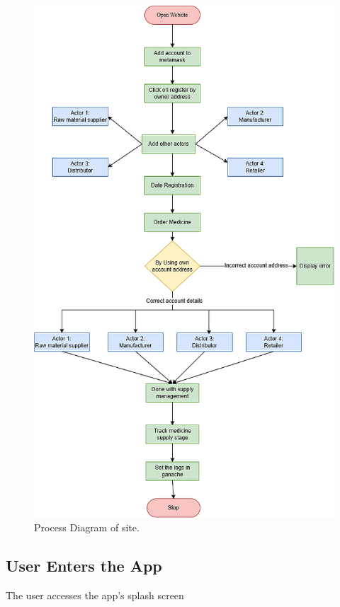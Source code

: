 \documentclass[conference]{IEEEtran}
\begin{document}
\begin{figure}
    \centering
    \includegraphics[width=1\linewidth]{assets/enhanced_final.png}
    \caption{Process Diagram of site.}
    \label{fig2}
\end{figure}



\subsection{User Enters the App}
The user accesses the app's splash screen
\end{document}
